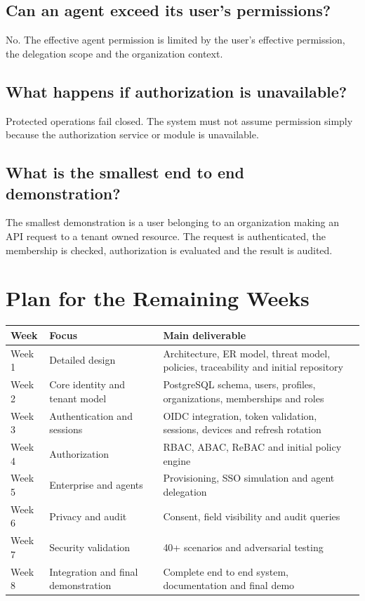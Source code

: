 \documentclass[11pt,a4paper]{article}
\begin{document}
\subsection{Can an agent exceed its user's permissions?}

No. The effective agent permission is limited by the user's effective permission, the delegation scope and the organization context.

\subsection{What happens if authorization is unavailable?}

Protected operations fail closed. The system must not assume permission simply because the authorization service or module is unavailable.

\subsection{What is the smallest end to end demonstration?}

The smallest demonstration is a user belonging to an organization making an API request to a tenant owned resource. The request is authenticated, the membership is checked, authorization is evaluated and the result is audited.

\section{Plan for the Remaining Weeks}

\begin{longtable}{p{}p{}p{}}
\toprule
Week & Focus & Main deliverable \\
\midrule
Week 1 & Detailed design & Architecture, ER model, threat model, policies, traceability and initial repository \\
Week 2 & Core identity and tenant model & PostgreSQL schema, users, profiles, organizations, memberships and roles \\
Week 3 & Authentication and sessions & OIDC integration, token validation, sessions, devices and refresh rotation \\
Week 4 & Authorization & RBAC, ABAC, ReBAC and initial policy engine \\
Week 5 & Enterprise and agents & Provisioning, SSO simulation and agent delegation \\
Week 6 & Privacy and audit & Consent, field visibility and audit queries \\
Week 7 & Security validation & 40+ scenarios and adversarial testing \\
Week 8 & Integration and final demonstration & Complete end to end system, documentation and final demo \\
\bottomrule
\end{longtable}
\end{document}
